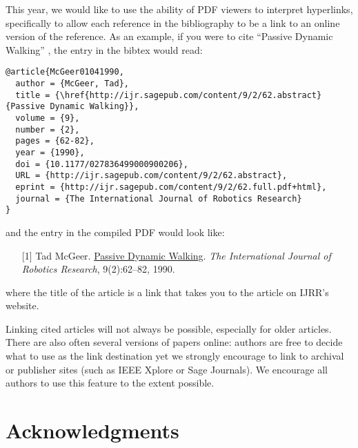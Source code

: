 \documentclass[conference]{IEEEtran}
\begin{document}
This year, we would like to use the ability of PDF viewers to interpret
hyperlinks, specifically to allow each reference in the bibliography to be a
link to an online version of the reference. 
As an example, if you were to cite ``Passive Dynamic Walking''
\cite{McGeer01041990}, the entry in the bibtex would read:

{\small
\begin{verbatim}
@article{McGeer01041990,
  author = {McGeer, Tad}, 
  title = {\href{http://ijr.sagepub.com/content/9/2/62.abstract}{Passive Dynamic Walking}}, 
  volume = {9}, 
  number = {2}, 
  pages = {62-82}, 
  year = {1990}, 
  doi = {10.1177/027836499000900206}, 
  URL = {http://ijr.sagepub.com/content/9/2/62.abstract}, 
  eprint = {http://ijr.sagepub.com/content/9/2/62.full.pdf+html}, 
  journal = {The International Journal of Robotics Research}
}
\end{verbatim}
}
\noindent
and the entry in the compiled PDF would look like:

\def\tmplabel#1{[#1]}

\begin{enumerate}
\item[\tmplabel{1}] Tad McGeer. \href{http://ijr.sagepub.com/content/9/2/62.abstract}{Passive Dynamic
Walking}. {\em The International Journal of Robotics Research}, 9(2):62--82,
1990.
\end{enumerate}
%
where the title of the article is a link that takes you to the article on IJRR's website. 


Linking cited articles will not always be possible, especially for
older articles. There are also often several versions of papers
online: authors are free to decide what to use as the link destination
yet we strongly encourage to link to archival or publisher sites
(such as IEEE Xplore or Sage Journals).  We encourage all authors to use this feature to
the extent possible.
\section*{Acknowledgments}




\end{document}
